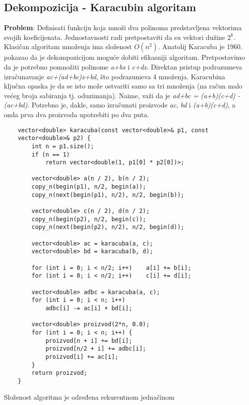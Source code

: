 \documentclass{article}
\begin{document}
\subsection{Dekompozicija - Karacubin algoritam}
\textbf{Problem}: Definisati funkciju koja množi dva polinoma predstavljena vektorima
svojih koeficijenata. Jednostavnosti radi pretpostaviti da su vektori dužine $2^k$.
\newline
Klasičan algoritam množenja ima složenost $O(n^2)$.
\newline
Anatolij Karacuba
je 1960. pokazao da je dekompozicijom moguće dobiti efikasniji algoritam.
Pretpostavimo da je potrebno pomnožiti polinome \textit{a+bx} i \textit{c+dx}. Direktan
pristup podrazumeva izračunavanje \textit{ac+(ad+bc)x+bd}, što podrazumeva 4
množenja. Karacubina ključna opaska je da se isto može ostvariti samo sa tri
množenja (na račun malo većeg broja sabiranja tj. oduzimanja).
Naime, važi da je \textit{ad+bc = (a+b)(c+d) - (ac+bd)}. Potrebno je, dakle, samo
izračunati proizvode \textit{ac}, \textit{bd} i \textit{(a+b)(c+d)}, a onda prva dva proizvoda upotrebiti
po dva puta.
\begin{lstlisting}
    vector<double> karacuba(const vector<double>& p1, const 
    vector<double>& p2) {
        int n = p1.size();
        if (n == 1)
            return vector<double(1, p1[0] * p2[0])>;
        
        vector<double> a(n / 2), b(n / 2);
        copy_n(begin(p1), n/2, begin(a));
        copy_n(next(begin(p1), n/2), n/2, begin(b));
        
        vector<double> c(n / 2), d(n / 2);
        copy_n(begin(p2), n/2, begin(c));
        copy_n(next(begin(p2), n/2), n/2, begin(d));
        
        vector<double> ac = karacuba(a, c);
        vector<double> bd = karacuba(b, d);
        
        for (int i = 0; i < n/2; i++)    a[i] += b[i];
        for (int i = 0; i < n/2; i++)    c[i] += d[i];
        
        vector<double> adbc = karacuba(a, c);
        for (int i = 0; i < n; i++)
            adbc[i] -= ac[i] + bd[i];
        
        vector<double> proizvod(2*n, 0.0);
        for (int i = 0; i < n; i++) {
            proizvod[n + i] += bd[i];
            proizvod[n/2 + i] += adbc[i];
            proizvod[i] += ac[i];
        }
        return proizvod;
    }
\end{lstlisting}
Složenost algoritma je određena rekurentnom jednačinom 
\end{document}
